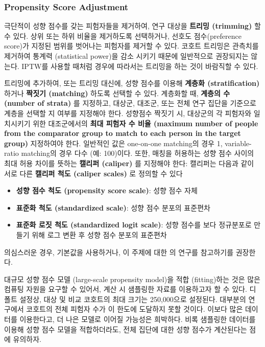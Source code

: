 \documentclass[11pt]{book}
\providecommand{\tightlist}{%
  \setlength{\itemsep}{0pt}\setlength{\parskip}{0pt}}
\theoremstyle{definition}
\theoremstyle{definition}
\theoremstyle{definition}
\theoremstyle{remark}
\begin{document}
\subsubsection*{Propensity Score
Adjustment}\label{propensity-score-adjustment}

극단적이 성향 점수를 갖는 피험자들을 제거하여, 연구 대상을
\textbf{트리밍 (trimming)} 할 수 있다. 상위 또는 하위 비율을 제거하도록
선택하거나, 선호도 점수(preference score)가 지정된 범위를 벗어나는
피험자를 제거할 수 있다. 코호트 트리밍은 관측치를 제거하여 통계력
(statistical power)을 감소 시키기 때문에 일반적으로 권장되지는 않는다.
IPTW를 사용할 때처럼 경우에 따라서는 트리밍을 하는 것이 바람직할 수
있다. 

트리밍에 추가하여, 또는 트리밍 대신에, 성향 점수를 이용해 \textbf{계층화
(stratification)} 하거나 \textbf{짝짓기 (matching)} 하도록 선택할 수
있다. 계층화할 때, \textbf{계층의 수 (number of strata)} 를 지정하고,
대상군, 대조군, 또는 전체 연구 집단을 기준으로 계층을 선택할 지 여부를
지정해야 한다. 성향점수 짝짓기 시, 대상군의 각 피험자와 일치시키기 위한
대조군에서의 \textbf{최대 피험자 수 비율 (maximum number of people from
the comparator group to match to each person in the target group)}
지정하여야 한다. 일반적인 값은 one-on-one matching의 경우 1,
variable-ratio matching의 경우 다수 (예: 100)이다. 또한, 매칭을 허용하는
성향 점수 사이의 최대 허용 차이를 뜻하는 \textbf{캘리퍼 (caliper)} 를
지정해야 한다: 캘리퍼는 다음과 같이 서로 다른 \textbf{캘리퍼 척도
(caliper scales)} 로 정의할 수 있다 

\begin{itemize}
\tightlist
\item
  \textbf{성향 점수 척도 (propensity score scale)}: 성향 점수 자체
\item
  \textbf{표준화 척도 (standardized scale)}: 성향 점수 분포의 표준편차
\item
  \textbf{표준화 로짓 척도 (standardized logit scale)}: 성향 점수를 보다
  정규분포로 만들기 위해 로그 변환 후 성향 점수 분포의 표준편차
\end{itemize}

의심스러운 경우, 기본값을 사용하거나, 이 주제에 대한 \citet{austin_2011}
의 연구를 참고하기를 권장한다.

대규모 성향 점수 모델 (large-scale propensity model)을 적합
(fitting)하는 것은 많은 컴퓨팅 자원을 요구할 수 있어서, 계산 시 샘플링한
자료를 이용하고자 할 수 있다. 디폴트 설정상, 대상 및 비교 코호트의 최대
크기는 250,000으로 설정된다. 대부분의 연구에서 코호트의 전체 피험자 수가
이 한도에 도달하지 못할 것이다. 이보다 많은 데이터를 이용한다고, 더 나은
모델로 이어질 가능성은 희박하다. 비록 샘플링한 데이터를 이용해 성향 점수
모델을 적합하더라도, 전체 집단에 대한 성향 점수가 계산된다는 점에
유의하자.
\end{document}
